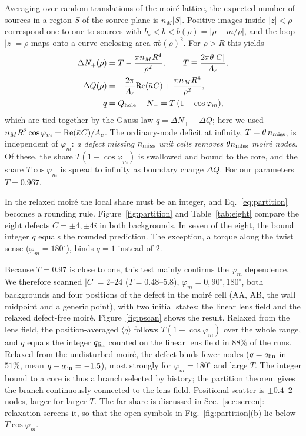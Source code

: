 \documentclass[prb,twocolumn,superscriptaddress,floatfix,10pt]{revtex4-2}
\begin{document}
Averaging over random translations of the moir\'e lattice, the expected number of sources in a region $S$ of the source plane is $n_M|S|$. Positive images inside $|z|<\rho$ correspond one-to-one to sources with $b_s<b<b(\rho)=|\rho-m/\rho|$, and the loop $|z|=\rho$ maps onto a curve enclosing area $\pi b(\rho)^2$. For $\rho>R$ this yields
\begin{align}
\Delta N_+(\rho)&=T-\frac{\pi n_MR^4}{\rho^2},\qquad T\equiv\frac{2\pi\theta|C|}{A_c},\nonumber\\
\Delta Q(\rho)&=-\frac{2\pi}{A_c}{\rm Re}(\bar\kappa C)+\frac{\pi n_MR^4}{\rho^2},\nonumber\\
q&=Q_{\rm hole}-N_-=T\,(1-\cos\varphi_m),
\label{eq:partition}
\end{align}
which are tied together by the Gauss law $q=\Delta N_++\Delta Q$; here we used $n_MR^2\cos\varphi_m={\rm Re}(\bar\kappa C)/A_c$. The ordinary-node deficit at infinity, $T=\theta\,n_{\rm miss}$, is independent of $\varphi_m$: \emph{a defect missing $n_{\rm miss}$ unit cells removes $\theta n_{\rm miss}$ moir\'e nodes}. Of these, the share $T(1-\cos\varphi_m)$ is swallowed and bound to the core, and the share $T\cos\varphi_m$ is spread to infinity as boundary charge $\Delta Q$. For our parameters $T=0.967$.

In the relaxed moir\'e the local share must be an integer, and Eq.~\eqref{eq:partition} becomes a rounding rule. Figure~\ref{fig:partition} and Table~\ref{tab:eight} compare the eight defects $C=\pm4,\pm4i$ in both backgrounds. In seven of the eight, the bound integer $q$ equals the rounded prediction. The exception, a torque along the twist sense ($\varphi_m=180^\circ$), binds $q=1$ instead of $2$.

Because $T=0.97$ is close to one, this test mainly confirms the $\varphi_m$ dependence. We therefore scanned $|C|=2$--$24$ ($T=0.48$--$5.8$), $\varphi_m=0,90^\circ,180^\circ$, both backgrounds and four positions of the defect in the moir\'e cell (AA, AB, the wall midpoint and a generic point), with two initial states: the linear lens field and the relaxed defect-free moir\'e. Figure~\ref{fig:pscan} shows the result. Relaxed from the lens field, the position-averaged $\langle q\rangle$ follows $T(1-\cos\varphi_m)$ over the whole range, and $q$ equals the integer $q_{\rm lin}$ counted on the linear lens field in $88\%$ of the runs. Relaxed from the undisturbed moir\'e, the defect binds fewer nodes ($q=q_{\rm lin}$ in $51\%$, mean $q-q_{\rm lin}=-1.5$), most strongly for $\varphi_m=180^\circ$ and large $T$. The integer bound to a core is thus a branch selected by history; the partition theorem gives the branch continuously connected to the lens field. Positional scatter is $\pm0.4$--$2$ nodes, larger for larger $T$. The far share is discussed in Sec.~\ref{sec:screen}: relaxation screens it, so that the open symbols in Fig.~\ref{fig:partition}(b) lie below $T\cos\varphi_m$.
\end{document}
